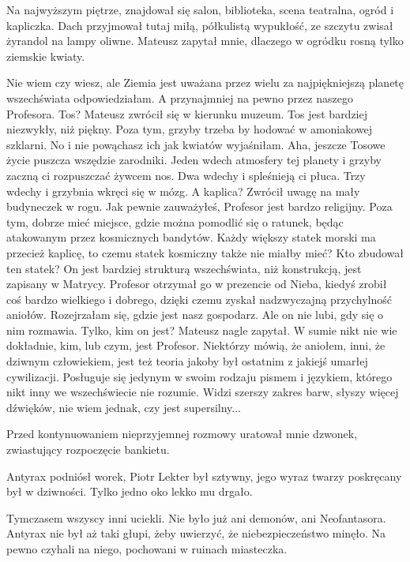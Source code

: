 Na najwyższym piętrze, znajdował się salon, biblioteka, scena teatralna, ogród i kapliczka.
Dach przyjmował tutaj miłą, półkulistą wypukłość, ze szczytu zwisał żyrandol na lampy oliwne.
Mateusz zapytał mnie, dlaczego w ogródku rosną tylko ziemskie kwiaty.

\begin{dialogue}
\ds{} Nie wiem czy wiesz, ale Ziemia jest uważana przez wielu za najpiękniejszą planetę wszechświata \dm{} odpowiedziałam. \dm{}
A przynajmniej na pewno przez naszego Profesora.
\ds{} Tos? \dm{} Mateusz zwrócił się w kierunku muzeum.
\ds{} Tos jest bardziej niezwykły, niż piękny. Poza tym, grzyby trzeba by hodować w amoniakowej szklarni.
No i nie powąchasz ich jak kwiatów \ds{} wyjaśniłam. \dm{} Aha, jeszcze Tosowe życie puszcza wszędzie zarodniki. 
Jeden wdech atmosfery tej planety i grzyby zaczną ci rozpuszczać żywcem nos. Dwa wdechy i spleśnieją ci płuca. Trzy wdechy i grzybnia wkręci się w mózg.
\ds{} A kaplica? \dm{} Zwrócił uwagę na mały budyneczek w rogu.
\ds{} Jak pewnie zauważyłeś, Profesor jest bardzo religijny. Poza tym, dobrze mieć miejsce, gdzie można pomodlić się o ratunek, będąc atakowanym przez kosmicznych bandytów. 
Każdy większy statek morski ma przecież kaplicę, to czemu statek kosmiczny także nie miałby mieć? 
\ds{} Kto zbudował ten statek?
\ds{} On jest bardziej strukturą wszechświata, niż konstrukcją, jest zapisany w Matrycy. 
Profesor otrzymał go w prezencie od Nieba, kiedyś zrobił coś bardzo wielkiego i dobrego, dzięki czemu zyskał nadzwyczajną przychylność aniołów. \dm{}
Rozejrzałam się, gdzie jest nasz gospodarz. \dm{}
Ale on nie lubi, gdy się o nim rozmawia.
\ds{} Tylko, kim on jest? \dm{} Mateusz nagle zapytał.
\ds{} W sumie nikt nie wie dokładnie, kim, lub czym, jest Profesor. 
Niektórzy mówią, że aniołem, inni, że dziwnym człowiekiem,
jest też teoria jakoby był ostatnim z jakiejś umarłej cywilizacji. 
Posługuje się jedynym w swoim rodzaju pismem i językiem, którego nikt inny we wszechświecie nie rozumie.
Widzi szerszy zakres barw, słyszy więcej dźwięków, nie wiem jednak, czy jest supersilny...
\end{dialogue}

Przed kontynuowaniem nieprzyjemnej rozmowy uratował mnie dzwonek, zwiastujący rozpoczęcie bankietu.

\divider{}

Antyrax podniósł worek, Piotr Lekter był sztywny, jego wyraz twarzy poskręcany był w dziwności. Tylko jedno oko lekko mu drgało.

Tymczasem wszyscy inni uciekli. Nie było już ani demonów, ani Neofantasora. Antyrax nie był aż taki głupi, żeby uwierzyć, że niebezpieczeństwo minęło. 
Na pewno czyhali na niego, pochowani w ruinach miasteczka.


